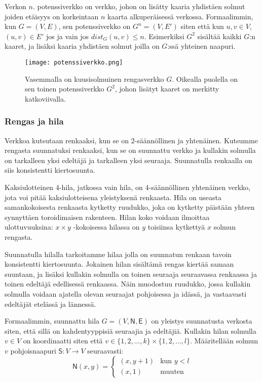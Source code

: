 \documentclass[12pt,finnish]{tktltiki2}
\theoremstyle{definition}
\theoremstyle{remark}
\begin{document}
Verkon $n.$ potenssiverkko on verkko, johon on lisätty kaaria yhdistäen solmut joiden etäisyys on korkeintaan $n$ kaarta alkuperäisessä verkossa. Formaalimmin, kun $G = (V, E)$, sen potenssiverkko on $G^n = (V, E')$ siten että kun $u, v \in V$, $(u, v) \in E'$ jos ja vain jos $dist_G(u, v) \leq n$. Esimerkiksi $G^2$ sisältää kaikki $G$:n kaaret, ja lisäksi kaaria yhdistäen solmut joilla on $G$:ssä yhteinen naapuri.
\begin{figure}
  \texttt{[image: potenssiverkko.png]}
  \caption{Vasemmalla on kuusisolmuinen rengasverkko $G$. Oikealla puolella on sen toinen potenssiverkko $G^2$, johon lisätyt kaaret on merkitty katkoviivalla.}
\end{figure}




\subsubsection{Rengas ja hila}

Verkkoa kutsutaan renkaaksi, kun se on $2$-säännöllinen ja yhtenäinen. Kutsumme rengasta suunnatuksi renkaaksi, kun se on suunnattu verkko ja kullakin solmulla on tarkalleen yksi edeltäjä ja tarkalleen yksi seuraaja. Suunnatulla renkaalla on siis konsistentti kiertosuunta.

Kaksiulotteinen 4-hila, jatkossa vain hila, on 4-säännöllinen yhtenäinen verkko, jota voi pitää kaksiulotteisena yleistyksenä renkaasta. Hila on useasta samankokoisesta renkaasta kytketty ruudukko, joka on kytketty päistään yhteen synnyttäen toroidimaisen rakenteen. Hilan koko voidaan ilmoittaa ulottuvuuksina: $x \times y$ -kokoisessa hilassa on $y$ toisiinsa kytkettyä $x$ solmun rengasta.

Suunnatulla hilalla tarkoitamme hilaa jolla on suunnatun renkaan tavoin konsistentti kiertosuunta. Jokainen hilan sisältämä rengas kiertää samaan suuntaan, ja lisäksi kullakin solmulla on toinen seuraaja seuraavassa renkaassa ja toinen edeltäjä edellisessä renkaassa. Näin muodostuu ruudukko, jossa kullakin solmulla voidaan ajatella olevan seuraajat pohjoisessa ja idässä, ja vastaavasti edeltäjät etelässä ja lännessä.

Formaalimmin, suunnattu hila $G = (V, \mathsf{N}, \mathsf{E})$ on yleistys suunnatusta verkosta siten, että sillä on kahdentyyppisiä seuraajia ja edeltäjiä. Kullakin hilan solmulla $v \in V$ on koordinaatti siten että $v \in \{1, 2, \ldots, k\} \times \{1, 2, \ldots, l\}$. Määritellään solmun $v$ pohjoisnaapuri $\mathsf{S}: V \rightarrow V$ seuraavasti:
\[ \mathsf{N}(x, y) = 
  \begin{cases}
   (x, y+1) & \text{kun } y < l \\
   (x, 1) & \text{muuten}
  \end{cases}
\]
\end{document}
